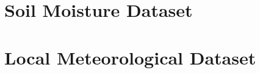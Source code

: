 \section{Soil Moisture Dataset}\label{sec:dataset}



\section{Local Meteorological Dataset}\label{sec:dataset}



% 